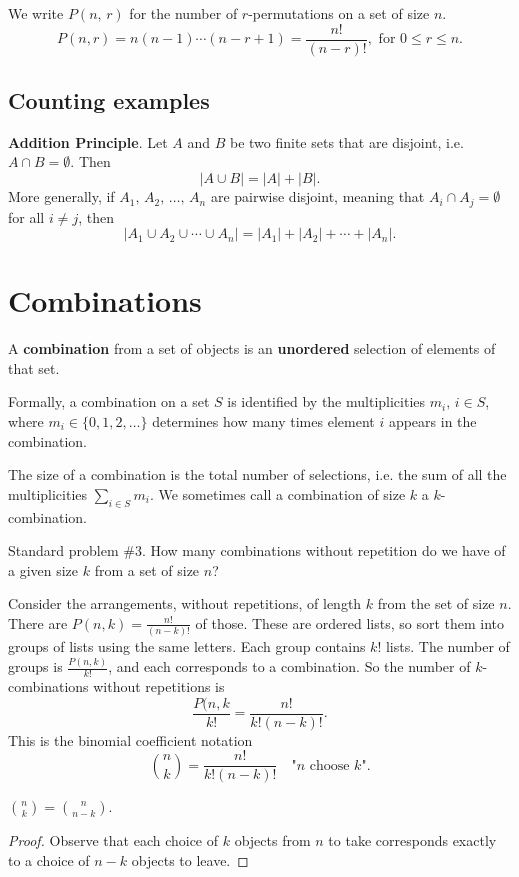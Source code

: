 \documentclass[10pt, a4paper]{article}
\begin{document}
We write $P(n,\,r)$ for the number of $r$-permutations on a set of size $n$.
\[
P(n, r) = n(n - 1)\dotsi (n - r + 1) = \frac{n!}{(n - r)!}, \text{ for } 0 \leq r \leq n.
\]

\subsection{Counting examples}

\textbf{Addition Principle}. Let $A$ and $B$ be two finite sets that are disjoint, i.e. $A \cap B = \emptyset$. Then
\[
|A \cup B| = |A| + |B|.
\]
More generally, if $A_1,\,A_2,\,\dotsc,\,A_n$ are pairwise disjoint, meaning that $A_i \cap A_j = \emptyset$ for all $i \neq j$, then
\[
|A_1 \cup A_2 \cup \dotsi \cup A_n| = |A_1| + |A_2| + \dotsi + |A_n|.
\]

\newpage

\section{Combinations}
\begin{definition}[Combination]
    A \textbf{combination} from a set of objects is an \textbf{unordered} selection of elements of that set.
\end{definition}

Formally, a combination on a set $S$ is identified by the multiplicities $m_i,\, i \in S$, where $m_i \in \{0, 1, 2, \dotsc\}$ determines how many times element $i$ appears in the combination.

The size of a combination is the total number of selections, i.e. the sum of all the multiplicities $\sum_{i \in S}m_i$. We sometimes call a combination of size $k$ a $k$-combination.

Standard problem \#3.
How many combinations without repetition do we have of a given size $k$ from a set of size $n$?

Consider the arrangements, without repetitions, of length $k$ from the set of size $n$. There are $P(n, k) = \frac{n!}{(n - k)!}$ of those. These are ordered lists, so sort them into groups of lists using the same letters. Each group contains $k!$ lists. The number of groups is $\frac{P(n, k)}{k!}$, and each corresponds to a combination. So the number of $k$-combinations without repetitions is
\[
\frac{P(n, k}{k!} = \frac{n!}{k!(n - k)!}.
\]
This is the binomial coefficient notation
\[
\binom{n}{k} = \frac{n!}{k!(n - k)!}\quad\text{"$n$ choose $k$"}.
\]

\begin{proposition}
    $\binom{n}{k} = \binom{n}{n - k}$.
    \begin{proof}
        Observe that each choice of $k$ objects from $n$ to take corresponds exactly to a choice of $n - k$ objects to leave.
    \end{proof}
\end{proposition}
\end{document}
